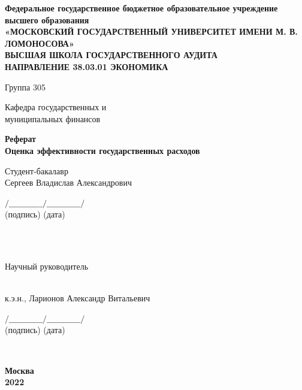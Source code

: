 \documentclass[12pt, a4paper]{extarticle}
\begin{document}
  \begin{titlepage}
    \begin{center}
      \bfseries
      Федеральное государственное бюджетное образовательное учреждение высшего
      образования \\
      «МОСКОВСКИЙ ГОСУДАРСТВЕННЫЙ УНИВЕРСИТЕТ ИМЕНИ М. В. ЛОМОНОСОВА» \\
      ВЫСШАЯ ШКОЛА ГОСУДАРСТВЕННОГО АУДИТА\\
      НАПРАВЛЕНИЕ 38.03.01 ЭКОНОМИКА
    \end{center}
    \vspace{1cm}
    \begin{minipage}{5cm}
        Группа 305
    \end{minipage}
    \hfill
    \begin{minipage}{9cm}
      Кафедра государственных и \\муниципальных финансов
    \end{minipage}
    \vspace{70pt}
    \begin{center}
       \bfseries
       Реферат \\
       \large
       Оценка эффективности государственных расходов
    \end{center}
    \vspace{100pt}
    Студент-бакалавр \\
    Сергеев Владислав Александрович
    \hfill
    \begin{minipage}{7cm}
      {$/\_\_\_\_\_\_\_\_\_\_\_\_/\_\_\_\_\_\_\_\_\_\_\_\_/$}\\
      \phantom{8pt} (подпись) \hspace{40pt}(дата)
    \end{minipage}
    \\
    \vspace{10pt}
    \\
    \begin{minipage}{7.4cm}
      Научный руководитель
    \end{minipage}
    \\
    к.э.н., Ларионов Александр Витальевич
    \hfill
    \begin{minipage}{7cm}
      {$/\_\_\_\_\_\_\_\_\_\_\_\_/\_\_\_\_\_\_\_\_\_\_\_\_/$}\\
      \phantom{8pt} (подпись) \hspace{40pt}(дата)
    \end{minipage}
  \\
  \vspace{\fill}
  \begin{center}
    \bfseries\large
    Москва\\
    2022
  \end{center}


  \end{titlepage}
  \addtocounter{page}{1}
\end{document}
